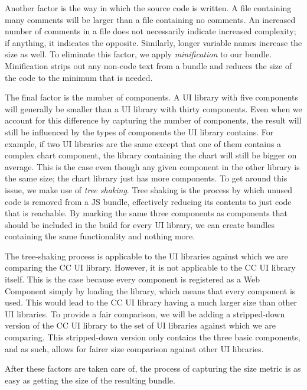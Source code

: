 Another factor is the way in which the source code is written. A file containing many comments will be larger than a file containing no comments. An increased number of comments in a file does not necessarily indicate increased complexity; if anything, it indicates the opposite. Similarly, longer variable names increase the size as well. To eliminate this factor, we apply \emph{minification} to our bundle. Minification strips out any non-code text from a bundle and reduces the size of the code to the minimum that is needed.

The final factor is the number of components. A UI library with five components will generally be smaller than a UI library with thirty components. Even when we account for this difference by capturing the number of components, the result will still be influenced by the types of components the UI library contains. For example, if two UI libraries are the same except that one of them contains a complex chart component, the library containing the chart will still be bigger on average. This is the case even though any given component in the other library is the same size; the chart library just has more components. To get around this issue, we make use of \emph{tree shaking}. Tree shaking is the process by which unused code is removed from a JS bundle, effectively reducing its contents to just code that is reachable. By marking the same three components as components that should be included in the build for every UI library, we can create bundles containing the same functionality and nothing more.

The tree-shaking process is applicable to the UI libraries against which we are comparing the CC UI library. However, it is not applicable to the CC UI library itself. This is the case because every component is registered as a Web Component simply by loading the library, which means that every component is used. This would lead to the CC UI library having a much larger size than other UI libraries. To provide a fair comparison, we will be adding a stripped-down version of the CC UI library to the set of UI libraries against which we are comparing. This stripped-down version only contains the three basic components, and as such, allows for fairer size comparison against other UI libraries.

After these factors are taken care of, the process of capturing the size metric is as easy as getting the size of the resulting bundle.

